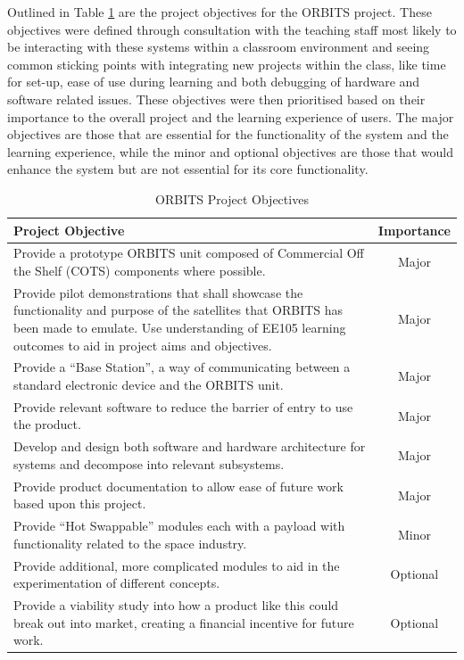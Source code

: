 \documentclass[a4paper,12pt,titlepage]{report}
\begin{document}
Outlined in Table \ref{tab:project_objectives} are the project objectives for the ORBITS project. These objectives were defined through consultation with the teaching staff most likely to be interacting with these systems within a classroom environment and seeing common sticking points with integrating new projects within the class, like time for set-up, ease of use during learning and both debugging of hardware and software related issues. These objectives were then prioritised based on their importance to the overall project and the learning experience of users. The major objectives are those that are essential for the functionality of the system and the learning experience, while the minor and optional objectives are those that would enhance the system but are not essential for its core functionality.

\begin{table}[h]
\centering
\caption{ORBITS Project Objectives}
\label{tab:project_objectives}
\begin{tabular}{|p{10cm}|c|}
\hline
\textbf{Project Objective} & \textbf{Importance} \\ \hline
Provide a prototype ORBITS unit composed of Commercial Off the Shelf (COTS) components where possible. & Major \\ \hline
Provide pilot demonstrations that shall showcase the functionality and purpose of the satellites that ORBITS has been made to emulate. Use understanding of EE105 learning outcomes to aid in project aims and objectives. & Major \\ \hline
Provide a ``Base Station'', a way of communicating between a standard electronic device and the ORBITS unit. & Major \\ \hline
Provide relevant software to reduce the barrier of entry to use the product. & Major \\ \hline
Develop and design both software and hardware architecture for systems and decompose into relevant subsystems. & Major \\ \hline
Provide product documentation to allow ease of future work based upon this project. & Major \\ \hline
Provide ``Hot Swappable'' modules each with a payload with functionality related to the space industry. & Minor \\ \hline
Provide additional, more complicated modules to aid in the experimentation of different concepts. & Optional \\ \hline
Provide a viability study into how a product like this could break out into market, creating a financial incentive for future work. & Optional \\ \hline
\end{tabular}
\end{table}
\end{document}
